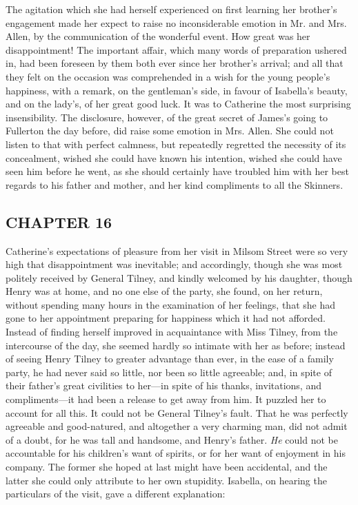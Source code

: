 The agitation which she had herself experienced on first learning her brother's engagement made her expect to raise no inconsiderable emotion in Mr. and Mrs. Allen, by the communication of the wonderful event. How great was her disappointment! The important affair, which many words of preparation ushered in, had been foreseen by them both ever since her brother's arrival; and all that they felt on the occasion was comprehended in a wish for the young people's happiness, with a remark, on the gentleman's side, in favour of Isabella's beauty, and on the lady's, of her great good luck. It was to Catherine the most surprising insensibility. The disclosure, however, of the great secret of James's going to Fullerton the day before, did raise some emotion in Mrs. Allen. She could not listen to that with perfect calmness, but repeatedly regretted the necessity of its concealment, wished she could have known his intention, wished she could have seen him before he went, as she should certainly have troubled him with her best regards to his father and mother, and her kind compliments to all the Skinners.

\subsection[chapter-16]{\useURL[url18][][][]\from[url18]CHAPTER 16}

Catherine's expectations of pleasure from her visit in Milsom Street were so very high that disappointment was inevitable; and accordingly, though she was most politely received by General Tilney, and kindly welcomed by his daughter, though Henry was at home, and no one else of the party, she found, on her return, without spending many hours in the examination of her feelings, that she had gone to her appointment preparing for happiness which it had not afforded. Instead of finding herself improved in acquaintance with Miss Tilney, from the intercourse of the day, she seemed hardly so intimate with her as before; instead of seeing Henry Tilney to greater advantage than ever, in the ease of a family party, he had never said so little, nor been so little agreeable; and, in spite of their father's great civilities to her---in spite of his thanks, invitations, and compliments---it had been a release to get away from him. It puzzled her to account for all this. It could not be General Tilney's fault. That he was perfectly agreeable and good-natured, and altogether a very charming man, did not admit of a doubt, for he was tall and handsome, and Henry's father. {\em He} could not be accountable for his children's want of spirits, or for her want of enjoyment in his company. The former she hoped at last might have been accidental, and the latter she could only attribute to her own stupidity. Isabella, on hearing the particulars of the visit, gave a different explanation: 

